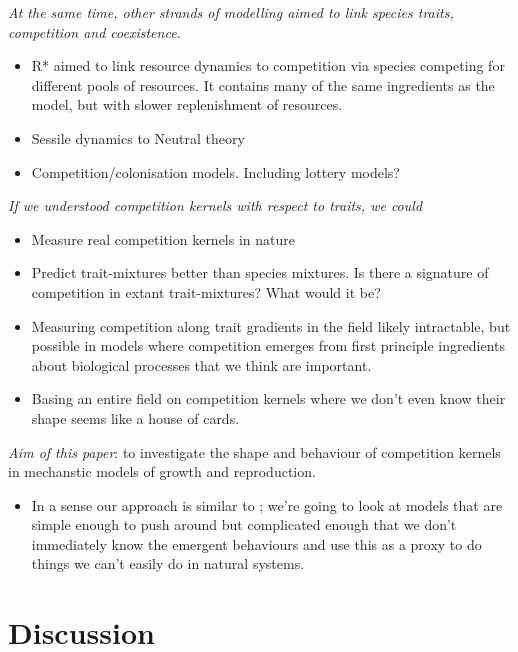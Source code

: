\documentclass[a4paper,11pt]{article}
\begin{document}
\textit{At the same time, other strands of modelling aimed to link
  species traits, competition and coexistence.}
\begin{itemize}
\item R* \citep{Tilman-1980,Tilman-1982} aimed to link resource
  dynamics to competition via species competing for different pools of
  resources.  It contains many of the same ingredients as the
  \citet{MacArthur-1967} model, but with slower replenishment of
  resources.
\item Sessile dynamics to Neutral theory
\item Competition/colonisation models.  Including lottery models?
\end{itemize}

\textit{If we understood competition kernels with respect to traits,
  we could}
\begin{itemize}
\item Measure real competition kernels in nature
\item Predict trait-mixtures better than species mixtures.  Is there a
  signature of competition in extant trait-mixtures?  What would it
  be?
\item Measuring competition along trait gradients in the field likely
  intractable, but possible in models where competition emerges from
  first principle ingredients about biological processes that we think
  are important.
\item Basing an entire field on competition kernels where we don't
  even know their shape seems like a house of cards.
\end{itemize}

\textit{Aim of this paper}: to investigate the shape and behaviour of
competition kernels in mechanstic models of growth and reproduction.
\begin{itemize}
\item In a sense our approach is similar to \citet{Draghi-2012}; we're
  going to look at models that are simple enough to push around but
  complicated enough that we don't immediately know the emergent
  behaviours and use this as a proxy to do things we can't easily do
  in natural systems.
\end{itemize}

\clearpage
\section{Discussion}
\end{document}
